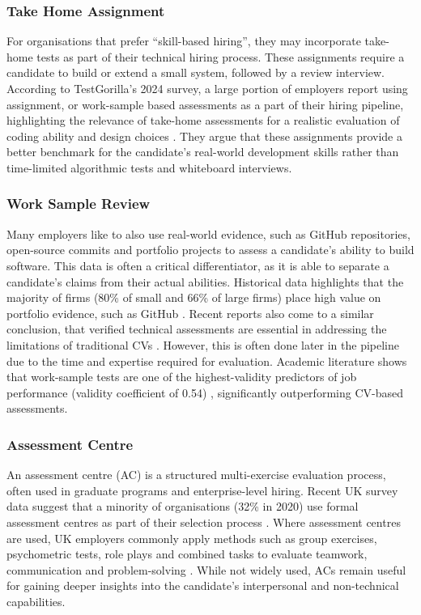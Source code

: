 \subsubsection{Take Home Assignment}
For organisations that prefer “skill-based hiring”, they may incorporate take-home tests as part of their technical hiring process. 
These assignments require a candidate to build or extend a small system, followed by a review interview. 
According to TestGorilla's 2024 survey, a large portion of employers report using assignment, or work-sample based assessments as a part of their hiring pipeline, highlighting the relevance of take-home assessments for a realistic evaluation of coding ability and design choices \cite{testgorilla2024}. 
They argue that these assignments provide a better benchmark for the candidate's real-world development skills rather than time-limited algorithmic tests and whiteboard interviews.

\subsubsection{Work Sample Review}
Many employers like to also use real-world evidence, such as GitHub repositories, open-source commits and portfolio projects to assess a candidate's ability to build software. 
This data is often a critical differentiator, as it is able to separate a candidate's claims from their actual abilities.
Historical data highlights that the majority of firms (80\% of small and 66\% of large firms) place high value on portfolio evidence,
such as GitHub \cite{hackerrank2018skills}. Recent reports also come to a similar conclusion, that verified technical 
assessments are essential in addressing the limitations of traditional CVs \cite{hackerrank2024skills}.
However, this is often done later in the pipeline due to the time and expertise required for evaluation. 
Academic literature shows that work-sample tests are one of the highest-validity predictors of job performance (validity coefficient of 0.54) \cite{schmidt1998}, significantly outperforming CV-based assessments.

\subsubsection{Assessment Centre}
An assessment centre (AC) is a structured multi-exercise evaluation process, often used in graduate programs and enterprise-level hiring. 
Recent UK survey data suggest that a minority of organisations (32\% in 2020) use formal assessment centres as part of their selection process \cite{cipd2020_resourcing}. 
Where assessment centres are used, UK employers commonly apply methods such as group exercises, psychometric tests, role plays and combined tasks to evaluate teamwork, communication and problem-solving \cite{cipd2022}. 
While not widely used, ACs remain useful for gaining deeper insights into the candidate's interpersonal and non-technical capabilities.

